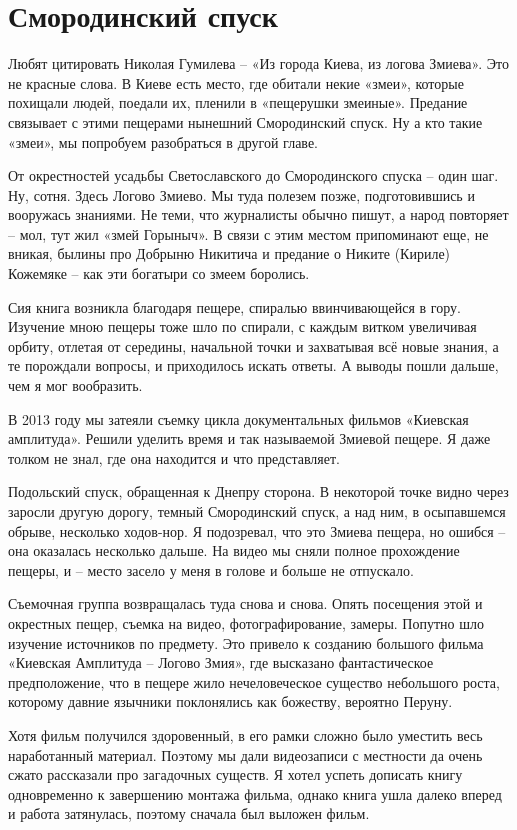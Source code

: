 \chapter{Смородинский спуск}

Любят цитировать Николая Гумилева – «Из города Киева, из логова Змиева». Это не красные слова. В Киеве есть место, где обитали некие «змеи», которые похищали людей, поедали их, пленили в «пещерушки змеиные». Предание связывает с этими пещерами нынешний Смородинский спуск. Ну а кто такие «змеи», мы попробуем разобраться в другой главе.

От окрестностей усадьбы Светославского до Смородинского спуска – один шаг. Ну, сотня. Здесь Логово Змиево. Мы туда полезем позже, подготовившись и вооружась знаниями. Не теми, что журналисты обычно пишут, а народ повторяет – мол, тут жил «змей Горыныч». В связи с этим местом припоминают еще, не вникая, былины про Добрыню Никитича и предание о Никите (Кириле) Кожемяке – как эти богатыри со змеем боролись.

Сия книга возникла благодаря пещере, спиралью ввинчивающейся в гору. Изучение мною пещеры тоже шло по спирали, с каждым витком увеличивая орбиту, отлетая от середины, начальной точки и захватывая всё новые знания, а те порождали вопросы, и приходилось искать ответы. А выводы пошли дальше, чем я мог вообразить.

В 2013 году мы затеяли съемку цикла документальных фильмов «Киевская амплитуда». Решили уделить время и так называемой Змиевой пещере. Я даже толком не знал, где она находится и что представляет.

Подольский спуск, обращенная к Днепру сторона. В некоторой точке видно через заросли другую дорогу, темный Смородинский спуск, а над ним, в осыпавшемся обрыве, несколько ходов-нор. Я подозревал, что это Змиева пещера, но ошибся – она оказалась несколько дальше. На видео мы сняли полное прохождение пещеры, и – место засело у меня в голове и больше не отпускало.

Съемочная группа возвращалась туда снова и снова. Опять посещения этой и окрестных пещер, съемка на видео, фотографирование, замеры. Попутно шло изучение источников по предмету. Это привело к созданию большого фильма «Киевская Амплитуда – Логово Змия», где высказано фантастическое предположение, что в пещере жило нечеловеческое существо небольшого роста, которому давние язычники поклонялись как божеству, вероятно Перуну.

Хотя фильм получился здоровенный, в его рамки сложно было уместить весь наработанный материал. Поэтому мы дали видеозаписи с местности да очень сжато рассказали про загадочных существ. Я хотел успеть дописать книгу одновременно к завершению монтажа фильма, однако книга ушла далеко вперед и работа затянулась, поэтому сначала был выложен фильм.

